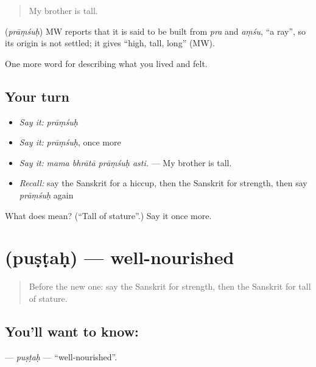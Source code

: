 \begin{quote}
My brother is tall.
\end{quote}

\begin{cousinweb}
\textbf{} (\emph{prāṃśuḥ}) MW reports that it is said to be built from \emph{pra} and \emph{aṃśu}, \textquotedblleft{}a ray\textquotedblright{}, so its origin is not settled; it gives \textquotedblleft{}high, tall, long\textquotedblright{} (MW).
\end{cousinweb}

\begin{grammarlens}[title={What you've built}]
One more word for describing what you lived and felt.
\end{grammarlens}

\subsection*{Your turn}
\begin{itemize}
\raggedright
  \item \emph{Say it:} \emph{prāṃśuḥ}
  \item \emph{Say it:} \emph{prāṃśuḥ}, once more
  \item \emph{Say it:} \emph{mama bhrātā prāṃśuḥ asti.} — My brother is tall.
  \item \emph{Recall:} say the Sanskrit for a hiccup, then the Sanskrit for strength, then say \emph{prāṃśuḥ} again
\end{itemize}

\begin{tcolorbox}[breakable,colback=teal!4,colframe=teal!35!black,title={Before you move on}]
What does  mean? (\textquotedblleft{}Tall of stature\textquotedblright{}.) Say it once more.
\end{tcolorbox}
\section[\texorpdfstring{\sk{पुष्टः} (puṣṭaḥ)}{पुष्टः (puṣṭaḥ)}]{ (puṣṭaḥ) — well-nourished}

\label{lesson:SA-C476-pustah}



\begin{quote}
Before the new one: say the Sanskrit for strength, then the Sanskrit for tall of stature.
\end{quote}

\subsection*{You'll want to know: }
\textbf{} — \emph{puṣṭaḥ} — \textquotedblleft{}well-nourished\textquotedblright{}.

